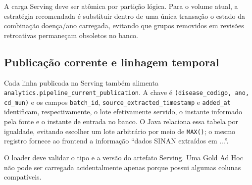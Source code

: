 A carga Serving deve ser atômica por partição lógica. Para o volume atual, a estratégia recomendada é substituir dentro de uma única transação o estado da combinação doença/ano carregada, evitando que grupos removidos em revisões retroativas permaneçam obsoletos no banco.

\subsection{Publicação corrente e linhagem temporal}

Cada linha publicada na Serving também alimenta
\texttt{analytics.pipeline\_current\_publication}. A chave é
\texttt{(disease\_codigo, ano, cd\_mun)} e os campos
\texttt{batch\_id}, \texttt{source\_extracted\_timestamp} e
\texttt{added\_at} identificam, respectivamente, o lote efetivamente servido, o
instante informado pela fonte e o instante de entrada no banco. O Java relaciona
essa tabela por igualdade, evitando escolher um lote arbitrário por meio de
\texttt{MAX()}; o mesmo registro fornece ao frontend a informação ``dados SINAN
extraídos em ...''.

\begin{regra}
O loader deve validar o tipo e a versão do artefato Serving. Uma Gold Ad Hoc não pode ser carregada acidentalmente apenas porque possui algumas colunas compatíveis.
\end{regra}
